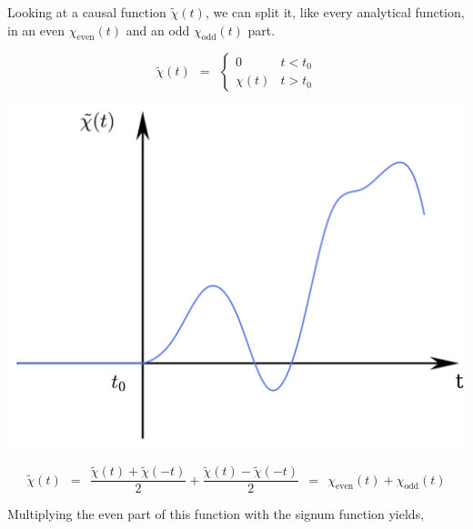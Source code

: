 \documentclass[10pt]{report}
\numberwithin{equation}{chapter}
\begin{document}
\begin{minipage}{0.40\textwidth}

  Looking at a causal function $\tilde{\chi}(t)$, we can split it, like every analytical function, in an even $\chi_\text{even}(t)$ and an odd $\chi_\text{odd}(t)$ part.

  \begin{equation*}
    \tilde{\chi}(t) ~~ = ~~ \left\{ \begin{array}{lc} 
      0        &  t < t_0 \\
      \chi(t)  &  t > t_0
    \end{array}\right.
  \end{equation*}
\end{minipage}
\begin{minipage}{0.05\textwidth}
\end{minipage}
\begin{minipage}{0.55\textwidth}
   \includegraphics[width=1.0\textwidth]{../img/causal_suscept.pdf}
\end{minipage}


\begin{equation} \label{eq:even_odd}
\tilde{\chi}(t) ~~ = ~~ \frac{\tilde{\chi}(t) + \tilde{\chi}(-t)}{2} + \frac{\tilde{\chi}(t) - \tilde{\chi}(-t)}{2} ~~ = ~~ \chi_\text{even}(t) + \chi_\text{odd}(t)
\end{equation}


Multiplying the even part of this function with the signum function yields,
\end{document}
